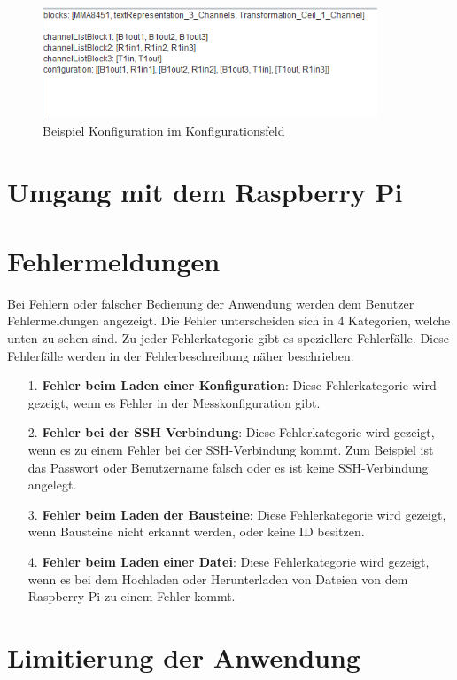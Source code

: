 \documentclass[parskip=full]{scrartcl}
\begin{document}
\begin{figure}[htbp]
    \begin{center}
        \includegraphics[width = 10cm]{Grafiken/KonfigBsp.png}
        \caption{Beispiel Konfiguration im Konfigurationsfeld}
        \label{KonfigBsp}
    \end{center}
\end{figure}



\section{Umgang mit dem Raspberry Pi}

\section{Fehlermeldungen}

Bei Fehlern oder falscher Bedienung der Anwendung werden dem Benutzer Fehlermeldungen angezeigt. Die Fehler unterscheiden sich in 4 Kategorien, welche unten zu sehen sind. Zu jeder Fehlerkategorie gibt es speziellere Fehlerfälle. Diese Fehlerfälle werden in der Fehlerbeschreibung näher beschrieben.

\begin{itemize}


\item[1.] \textbf{Fehler beim Laden einer Konfiguration}: Diese Fehlerkategorie wird gezeigt, wenn es Fehler in der Messkonfiguration gibt.

\item[2.] \textbf{Fehler bei der SSH Verbindung}: Diese Fehlerkategorie wird gezeigt, wenn es zu einem Fehler bei der SSH-Verbindung kommt. Zum Beispiel ist das Passwort oder Benutzername falsch oder es ist keine SSH-Verbindung angelegt.

\item[3.] \textbf{Fehler beim Laden der Bausteine}: Diese Fehlerkategorie wird gezeigt, wenn Bausteine nicht erkannt werden, oder keine ID besitzen.

\item[4.] \textbf{Fehler beim Laden einer Datei}: Diese Fehlerkategorie wird gezeigt, wenn es bei dem Hochladen oder Herunterladen von Dateien von dem Raspberry Pi zu einem Fehler kommt.

\end{itemize}

\section{Limitierung der Anwendung}


\printnoidxglossaries				%
\end{document}
